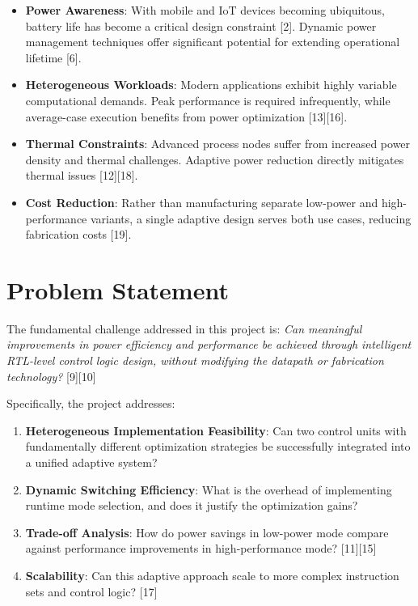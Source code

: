 \documentclass[15pt,a4paper]{report}
\begin{document}
\begin{itemize}
    \item \textbf{Power Awareness}: With mobile and IoT devices becoming ubiquitous, battery life has become a critical design constraint [2]. Dynamic power management techniques offer significant potential for extending operational lifetime [6].
    
    \item \textbf{Heterogeneous Workloads}: Modern applications exhibit highly variable computational demands. Peak performance is required infrequently, while average-case execution benefits from power optimization [13][16].
    
    \item \textbf{Thermal Constraints}: Advanced process nodes suffer from increased power density and thermal challenges. Adaptive power reduction directly mitigates thermal issues [12][18].
    
    \item \textbf{Cost Reduction}: Rather than manufacturing separate low-power and high-performance variants, a single adaptive design serves both use cases, reducing fabrication costs [19].
\end{itemize}

\section{Problem Statement}

The fundamental challenge addressed in this project is: \textit{Can meaningful improvements in power efficiency and performance be achieved through intelligent RTL-level control logic design, without modifying the datapath or fabrication technology?} [9][10]

Specifically, the project addresses:

\begin{enumerate}
    \item \textbf{Heterogeneous Implementation Feasibility}: Can two control units with fundamentally different optimization strategies be successfully integrated into a unified adaptive system?
    
    \item \textbf{Dynamic Switching Efficiency}: What is the overhead of implementing runtime mode selection, and does it justify the optimization gains?
    
    \item \textbf{Trade-off Analysis}: How do power savings in low-power mode compare against performance improvements in high-performance mode? [11][15]
    
    \item \textbf{Scalability}: Can this adaptive approach scale to more complex instruction sets and control logic? [17]
\end{enumerate}
\end{document}
